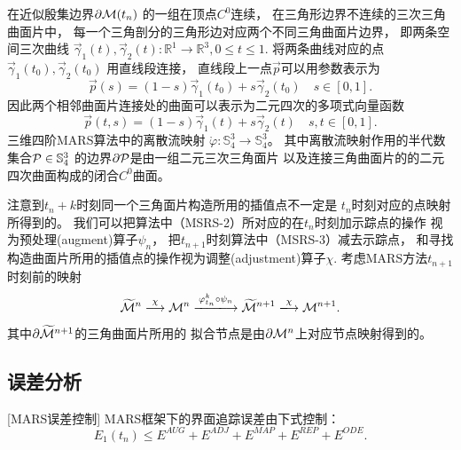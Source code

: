 \begin{rem}
  在近似殷集边界$\partial {\cal M}(t_n)$
  的一组在顶点$C^0$连续，
  在三角形边界不连续的三次三角曲面片中，
  每一个三角剖分的三角形边对应两个不同三角曲面片边界，
  即两条空间三次曲线
  $\vec{\gamma}_1(t),\vec{\gamma}_2(t)
  : \mathbb{R}^1\rightarrow \mathbb{R}^3,
  0\leq t\leq 1.$
  将两条曲线对应的点$\vec{\gamma}_1(t_0),\vec{\gamma}_2(t_0)$
  用直线段连接，
  直线段上一点$\vec{p}$可以用参数表示为
  \begin{displaymath}
    \vec{p}(s)=(1-s)\vec{\gamma}_1(t_0)+s\vec{\gamma}_2(t_0)
    \quad s\in [0,1].
  \end{displaymath}
  因此两个相邻曲面片连接处的曲面可以表示为二元四次的多项式向量函数
    \begin{displaymath}
    \vec{p}(t,s)=(1-s)\vec{\gamma}_1(t)+s\vec{\gamma}_2(t)
    \quad s,t\in [0,1].
  \end{displaymath}
  三维四阶MARS算法中的离散流映射
  $\mathring{\varphi}:\mathbb{S}^3_4\rightarrow \mathbb{S}^3_4 $。
  其中离散流映射作用的半代数集合${\cal P}\in \mathbb{S}^3_4$
  的边界$\partial {\cal P}$是由一组二元三次三角面片
  以及连接三角曲面片的的二元四次曲面构成的闭合$C^0$曲面。
\end{rem}

\begin{rem}
  注意到$t_n+k$时刻同一个三角面片构造所用的插值点不一定是
  $t_n$时刻对应的点映射所得到的。
  我们可以把算法中（MSRS-2）所对应的在$t_n$时刻加示踪点的操作
  视为预处理(augment)算子$\psi_n$，
  把$t_{n+1}$时刻算法中（MSRS-3）减去示踪点，
  和寻找构造曲面片所用的插值点的操作视为调整(adjustment)算子$\chi.$
  考虑MARS方法$t_{n+1}$时刻前的映射
  \begin{equation}
    \widetilde{{\cal M}}^n\stackrel{\chi}{\longrightarrow}
    {\cal M}^n\xlongrightarrow{\varphi_{t_n}^k\circ\psi_n}
    \widetilde{{\cal M}}^{n+1}\xlongrightarrow{\chi}{\cal M}^{n+1}.
  \end{equation}
  其中$\partial\widetilde{{\cal M}}^{n+1}$的三角曲面片所用的
  拟合节点是由$\partial {\cal M}^n$上对应节点映射得到的。
\end{rem}
\subsection{误差分析}

\begin{thm}\cite{zhang2016mars}[MARS误差控制]
  MARS框架下的界面追踪误差由下式控制：
   \begin{equation}
    E_1(t_n)\leq E^{AUG}+E^{ADJ}+E^{MAP}+E^{REP}+E^{ODE}.
  \end{equation}
\end{thm}


